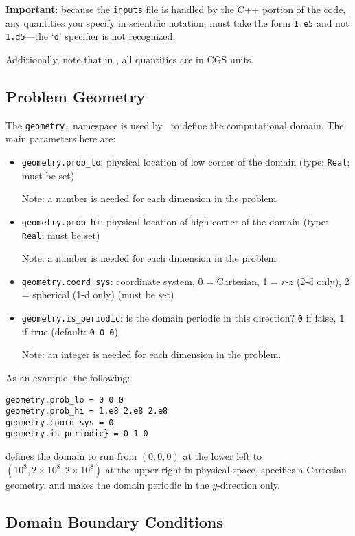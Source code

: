 {\bf Important}: because the {\tt inputs} file is handled by the C++ portion of
the code, any quantities you specify in scientific notation, must take the
form {\tt 1.e5} and not {\tt 1.d5}---the `{\tt d}' specifier is not recognized.

Additionally, note that in \castro, all quantities are in CGS units.

\subsection{Problem Geometry}

The {\tt geometry.} namespace is used by \boxlib\ to define the
computational domain.  The main parameters here are:
\begin{itemize}
\item {\tt geometry.prob\_lo}: physical location of low corner of the
domain (type: {\tt Real}; must be set)

  Note: a number is needed for each dimension in the problem
  
\item {\tt geometry.prob\_hi}: physical location of high corner of the
domain (type: {\tt Real}; must be set)

  Note: a number is needed for each dimension in the problem
  
\item {\tt geometry.coord\_sys}: coordinate system, 0 = Cartesian,
1 = $r$-$z$ (2-d only), 2 = spherical (1-d only) (must be set)

\item {\tt geometry.is\_periodic}: is the domain periodic in this direction?
  {\tt 0} if false, {\tt 1} if true  (default: {\tt 0 0 0}) 

  Note: an integer is needed for each dimension in the problem.
\end{itemize}

As an example, the following:
\begin{lstlisting}
geometry.prob_lo = 0 0 0
geometry.prob_hi = 1.e8 2.e8 2.e8 
geometry.coord_sys = 0 
geometry.is_periodic} = 0 1 0 
\end{lstlisting}
defines the domain to run from $(0,0,0)$ at the lower left to
$(10^8,2\times 10^8,2\times 10^8)$ at the upper right in physical space, specifies a
Cartesian geometry, and makes the domain periodic in the $y$-direction
only.


\subsection{Domain Boundary Conditions}

